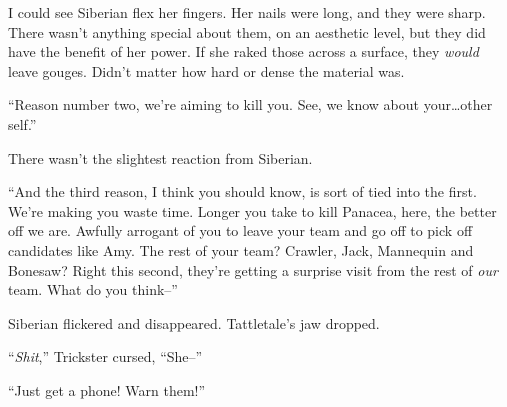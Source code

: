 I could see Siberian flex her fingers.  Her nails were long, and they were sharp.  There wasn't anything special about them, on an aesthetic level, but they did have the benefit of her power.  If she raked those across a surface, they \emph{would} leave gouges.  Didn't matter how hard or dense the material was.



``Reason number two, we're aiming to kill you.  See, we know about your\ldots other self.''



There wasn't the slightest reaction from Siberian.



``And the third reason, I think you should know, is sort of tied into the first.  We're making you waste time.  Longer you take to kill Panacea, here, the better off we are.  Awfully arrogant of you to leave your team and go off to pick off candidates like Amy.  The rest of your team?  Crawler, Jack, Mannequin and Bonesaw?  Right this second, they're getting a surprise visit from the rest of \emph{our} team.  What do you think--''



Siberian flickered and disappeared.  Tattletale's jaw dropped.



``\emph{Shit},'' Trickster cursed, ``She--''



``Just get a phone!  Warn them!''





